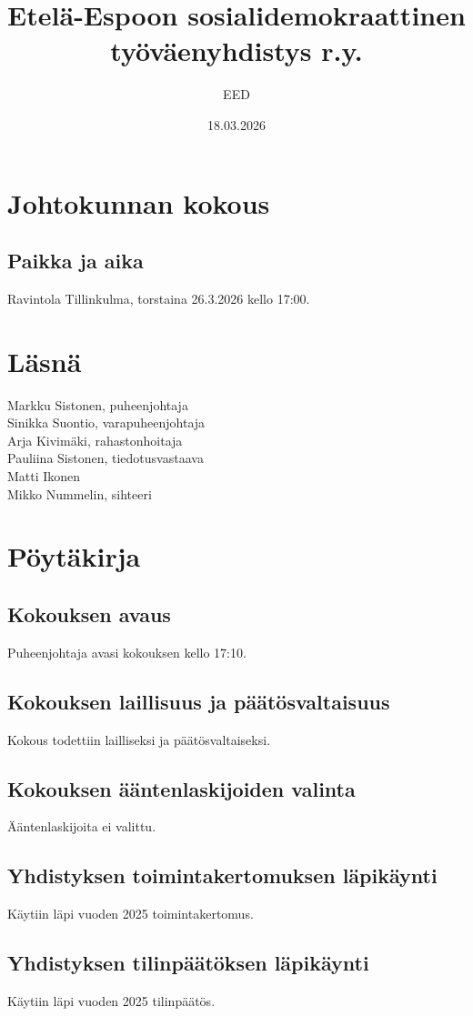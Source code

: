 \documentclass[a4paper,12pt]{article}
\title{Etelä-Espoon sosialidemokraattinen työväenyhdistys r.y.}
\author{EED}
\date{18.03.2026}
\begin{document}
\maketitle
\tableofcontents
\section*{Johtokunnan kokous}
\subsection*{Paikka ja aika}
Ravintola Tillinkulma, torstaina 26.3.2026 kello 17:00.
\section*{Läsnä}
Markku Sistonen, puheenjohtaja \\
Sinikka Suontio, varapuheenjohtaja \\
Arja Kivimäki, rahastonhoitaja \\
Pauliina Sistonen, tiedotusvastaava \\
Matti Ikonen \\
Mikko Nummelin, sihteeri
\section*{Pöytäkirja}
\subsection{Kokouksen avaus}
Puheenjohtaja avasi kokouksen kello 17:10.
\subsection{Kokouksen laillisuus ja päätösvaltaisuus}
Kokous todettiin lailliseksi ja päätösvaltaiseksi.
\subsection{Kokouksen ääntenlaskijoiden valinta}
Ääntenlaskijoita ei valittu.
\subsection{Yhdistyksen toimintakertomuksen läpikäynti}
Käytiin läpi vuoden 2025 toimintakertomus.
\subsection{Yhdistyksen tilinpäätöksen läpikäynti}
Käytiin läpi vuoden 2025 tilinpäätös.
\end{document}
